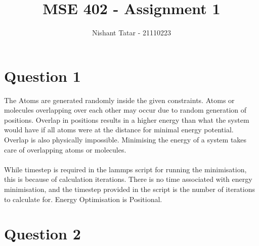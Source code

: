 \documentclass[11pt]{article}
\title{MSE 402 - Assignment 1}
\date{}
\author{Nishant Tatar - 21110223}
\begin{document}
\maketitle

\section{Question 1}
The Atoms are generated randomly inside the given constraints. Atoms or molecules overlapping over each other may occur due to random generation of positions. Overlap in positions results in a higher energy than what the system would have if all atoms were at the distance for minimal energy potential. Overlap is also physically impossible. Minimising the energy of a system takes care of overlapping atoms or molecules.\\ \\
While timestep is required in the lammps script for running the minimisation, this is because of calculation iterations. There is no time associated with energy minimisation, and the timestep provided in the script is the number of iterations to calculate for. Energy Optimisation is Positional.

\section{Question 2}
\end{document}
